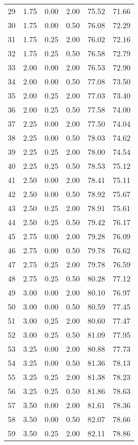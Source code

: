 \begin{tabular}{rrrrrr}
  29 & 1.75 & 0.00 & 2.00 & 75.52 & 71.66 \\ 
  30 & 1.75 & 0.00 & 0.50 & 76.08 & 72.29 \\ 
  31 & 1.75 & 0.25 & 2.00 & 76.02 & 72.16 \\ 
  32 & 1.75 & 0.25 & 0.50 & 76.58 & 72.79 \\ 
  33 & 2.00 & 0.00 & 2.00 & 76.53 & 72.90 \\ 
  34 & 2.00 & 0.00 & 0.50 & 77.08 & 73.50 \\ 
  35 & 2.00 & 0.25 & 2.00 & 77.03 & 73.40 \\ 
  36 & 2.00 & 0.25 & 0.50 & 77.58 & 74.00 \\ 
  37 & 2.25 & 0.00 & 2.00 & 77.50 & 74.04 \\ 
  38 & 2.25 & 0.00 & 0.50 & 78.03 & 74.62 \\ 
  39 & 2.25 & 0.25 & 2.00 & 78.00 & 74.54 \\ 
  40 & 2.25 & 0.25 & 0.50 & 78.53 & 75.12 \\ 
  41 & 2.50 & 0.00 & 2.00 & 78.41 & 75.11 \\ 
  42 & 2.50 & 0.00 & 0.50 & 78.92 & 75.67 \\ 
  43 & 2.50 & 0.25 & 2.00 & 78.91 & 75.61 \\ 
  44 & 2.50 & 0.25 & 0.50 & 79.42 & 76.17 \\ 
  45 & 2.75 & 0.00 & 2.00 & 79.28 & 76.09 \\ 
  46 & 2.75 & 0.00 & 0.50 & 79.78 & 76.62 \\ 
  47 & 2.75 & 0.25 & 2.00 & 79.78 & 76.59 \\ 
  48 & 2.75 & 0.25 & 0.50 & 80.28 & 77.12 \\ 
  49 & 3.00 & 0.00 & 2.00 & 80.10 & 76.97 \\ 
  50 & 3.00 & 0.00 & 0.50 & 80.59 & 77.45 \\ 
  51 & 3.00 & 0.25 & 2.00 & 80.60 & 77.47 \\ 
  52 & 3.00 & 0.25 & 0.50 & 81.09 & 77.95 \\ 
  53 & 3.25 & 0.00 & 2.00 & 80.88 & 77.73 \\ 
  54 & 3.25 & 0.00 & 0.50 & 81.36 & 78.13 \\ 
  55 & 3.25 & 0.25 & 2.00 & 81.38 & 78.23 \\ 
  56 & 3.25 & 0.25 & 0.50 & 81.86 & 78.63 \\ 
  57 & 3.50 & 0.00 & 2.00 & 81.61 & 78.36 \\ 
  58 & 3.50 & 0.00 & 0.50 & 82.07 & 78.66 \\ 
  59 & 3.50 & 0.25 & 2.00 & 82.11 & 78.86 \\ 

\end{tabular}
